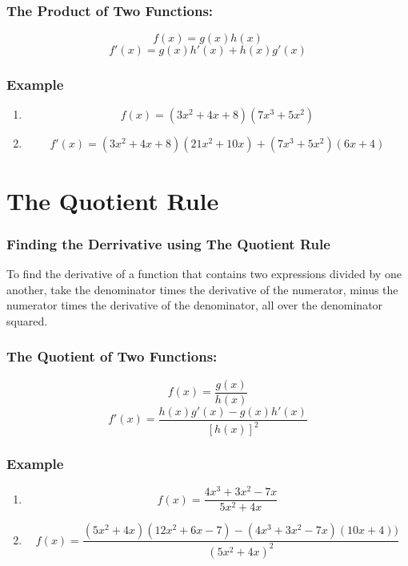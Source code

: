 \documentclass[a4paper,11pt]{book}
\begin{document}
\subsubsection{The Product  of Two Functions:}
\LARGE 
\[ f(x) = g(x)h(x) \]
\[ f'(x) = g(x)h'(x) + h(x)g'(x) \]

\subsubsection{Example}
\LARGE 
\begin{enumerate}
  \item \[ f(x) = (3x^2 + 4x + 8)(7x^3 + 5x^2) \]
  \item \[ f'(x) = (3x^2 + 4x + 8)(21x^2 + 10x) + (7x^3 + 5x^2)(6x + 4) \]
\end{enumerate}
\normalsize 










\section{The Quotient Rule}
\subsubsection{Finding the Derrivative using The Quotient Rule}


\normalsize 
To find the derivative of a function that contains two expressions divided by one another, take the denominator times the derivative of the numerator, minus the numerator times the derivative of the denominator, all over the denominator squared.

\subsubsection{The Quotient  of Two Functions:}
\LARGE 
\[ f(x) = \frac{g(x)}{h(x)} \]
\[ f'(x) = \frac{h(x)g'(x)-g(x)h'(x)}{[h(x)]^2} \]

\subsubsection{Example}
\LARGE 
\begin{enumerate}
  \item \[ f(x) = \frac{4x^3 + 3x^2 - 7x}{5x^2 + 4x} \]
  \item \large \[ f(x) = \frac{(5x^2 + 4x)(12x^2 + 6x - 7) - (4x^3 + 3x^2 - 7x)(10x + 4))}{(5x^2 + 4x)^2} \]
\end{enumerate}
\normalsize 
\end{document}
